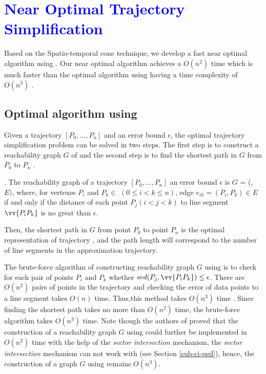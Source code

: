\section{\textcolor{blue}{Near Optimal Trajectory Simplification}}
\label{sec-optimal}

Based on the Spatio-temporal cone technique, we develop a fast near optimal algorithm using \sed. Our near optimal algorithm achieves a $O(n^2)$ time which is much faster than the optimal algorithm using \sed having a time complexity of $O(n^3)$ \cite{Imai:Optimal}.


\subsection{Optimal algorithm using \sed}

Given a trajectory ${[P_0, \ldots, P_n]}$ and an error bound $\epsilon$, the optimal trajectory simplification problem can be solved in two steps. 
The first step is to construct a reachability graph $G$ of  and the second step is to find the shortest path in $G$ from $P_0$ to $P_{n}$ \cite{Imai:Optimal, Chan:Optimal}.

. The reachability graph of a trajectory ${[P_0, \ldots, P_n]}$ \wrt an error bound $\epsilon$ is $G$
= (, $E)$, where, for vertexes $P_i$ and $P_k \in$  $(0 \le i<k\le n)$, edge $e_{ik}=(P_i, P_k) \in E$ if and only if the distance of each point $P_j (i<j<k)$ to line segment $\vv{P_iP_k}$ is no great than $\epsilon$.

Then, the shortest path in $G$ from point $P_0$ to point $P_{n}$ is the optimal representation of trajectory , and the path length will correspond to the number of line segments in the approximation trajectory. 


The brute-force algorithm of constructing reachability graph $G$ using \sed is to check for each pair of points $P_i$ and $P_k$ whether $sed(P_j, \vv{P_iP_k}) \le \epsilon$. 
There are $O(n^2)$ pairs of points in the trajectory and checking the error of data points to a line segment takes $O(n)$ time. 
Thus,this method takes $O(n^3)$ time \cite{Imai:Optimal}. 
Since finding the shortest path takes no more than $O(n^2)$ time, the brute-force algorithm takes $O(n^3)$ time.
%
Note though the authors of \cite{Chan:Optimal} proved that the construction of a reachability graph $G$ using \ped could further be implemented in $O(n^2)$ time with the help of the \textit{sector intersection} mechanism, the \textit{sector intersection} mechanism can not work with \sed (see Section \ref{sub-ci-ped}), hence, the construction of a graph  $G$ using \sed remains $O(n^3)$.

